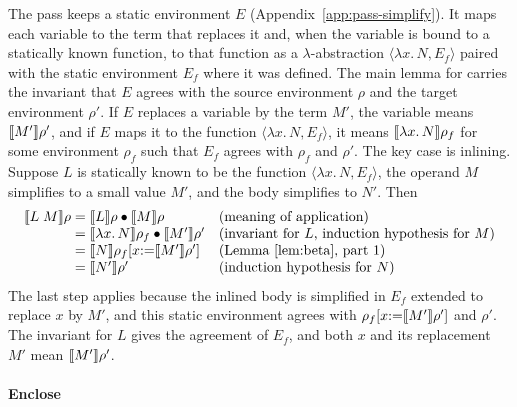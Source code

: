 The pass  keeps a static environment $E$
(Appendix~\ref{app:pass-simplify}). It maps each variable to the term
that replaces it and, when the variable is bound to a statically known
function, to that function as a $\lambda$-abstraction $\langle \lambda
x.\, N, E_f \rangle$ paired with the static environment $E_f$ where it
was defined. The main lemma for  carries the invariant
that $E$ agrees with the source environment $\rho$ and the target
environment $\rho'$. If $E$ replaces a variable by the term $M'$, the
variable means $\llbracket M' \rrbracket\rho'$, and if $E$ maps it to the function
$\langle \lambda x.\, N, E_f \rangle$, it means $\llbracket \lambda x.\,
  N \rrbracket\rho_f$ for some environment $\rho_f$ such that $E_f$ agrees with
$\rho_f$ and $\rho'$. The key case is inlining. Suppose $L$ is
statically known to be the function $\langle \lambda x.\, N, E_f
\rangle$, the operand $M$ simplifies to a small value $M'$, and the
body simplifies to $N'$. Then
{\small
\[
\begin{array}{@{}r@{\;}c@{\;}l@{\quad}l@{}}
  \den{L\;M}\rho & = & \den{L}\rho \app \den{M}\rho & \text{(meaning of application)}\\
    & = & \den{\lambda x.\,N}\rho_f \app \den{M'}\rho' & \text{(invariant for $L$, induction hypothesis for $M$)}\\
    & = & \den{N}\rho_f[x{:=}\den{M'}\rho'] & \text{(Lemma~\ref{lem:beta}, part 1)}\\
    & = & \den{N'}\rho' & \text{(induction hypothesis for $N$)}
\end{array}
\]}
The last step applies because the inlined body is simplified in $E_f$
extended to replace $x$ by $M'$, and this static environment agrees
with $\rho_f[x{:=}\llbracket M' \rrbracket\rho']$ and $\rho'$. The invariant for $L$
gives the agreement of $E_f$, and both $x$ and its replacement $M'$
mean $\llbracket M' \rrbracket\rho'$.


\paragraph{Enclose}

